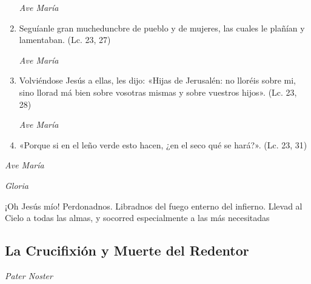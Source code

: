 \documentclass[a4paper,11pt, oneside]{report}
\begin{document}
\begin{enumerate}
          \textit{Ave María}

          \item Seguíanle gran mucheduncbre de pueblo y de mujeres, las cuales le plañían y lamentaban. (Lc. 23, 27)

          \textit{Ave María}

          \item Volviéndose Jesús a ellas, les dijo: «Hijas de Jerusalén: no lloréis sobre mi, sino llorad má bien sobre vosotras mismas y sobre
          vuestros hijos». (Lc. 23, 28)

          \textit{Ave María}

          \item «Porque si en el leño verde esto hacen, ¿en el seco qué se hará?». (Lc. 23, 31)

        \end{enumerate}

        \textit{Ave María} \par
        \indent\textit{Gloria} \par
        \indent¡Oh Jesús mío! Perdonadnos. Libradnos del fuego enterno del infierno. Llevad al Cielo a todas las almas, y socorred especialmente a las más 
        necesitadas

      \subsection*{La Crucifixión y Muerte del Redentor}
      
        \textit{Pater Noster}
\end{document}
